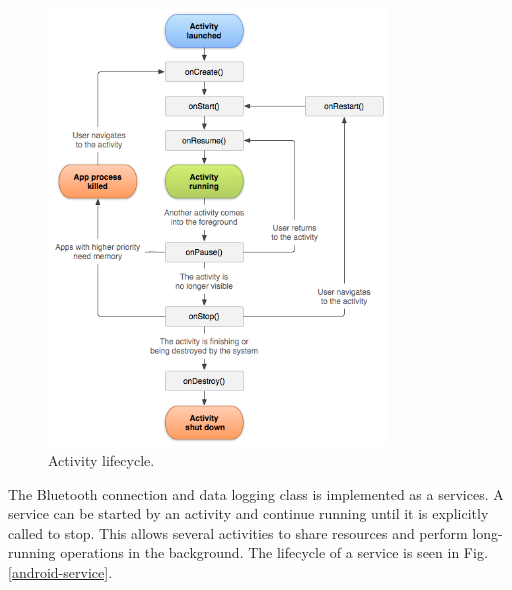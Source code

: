 \begin{figure}[H]
\centering
\includegraphics[width=0.8\textwidth]{Figures/activity_lifecycle.png}
\caption{Activity lifecycle.}
\label{android-activity}
\end{figure}
The Bluetooth connection and data logging class is implemented as a services\cite{android-service}. A service can be started by an activity and continue running until it is explicitly called to stop. This allows several activities to share resources and perform long-running operations in the background. The lifecycle
of a service is seen in Fig. \ref{android-service}.

